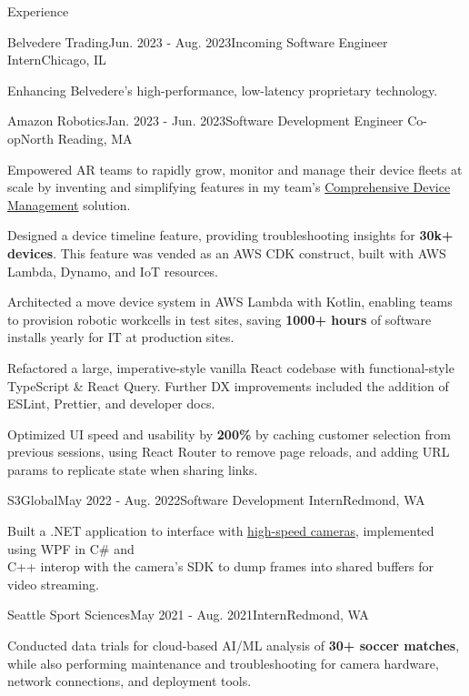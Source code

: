\documentclass{resume}
\begin{document}
  \begin{rSection}{Experience}
    \begin{rSubsection}{Belvedere Trading}{Jun. 2023 - Aug. 2023}{Incoming Software Engineer Intern}{Chicago, IL}
        \item Enhancing Belvedere’s high-performance, low-latency proprietary technology.
    \end{rSubsection}
    \begin{rSubsection}{Amazon Robotics}{Jan. 2023 - Jun. 2023}{Software Development Engineer Co-op}{North Reading, MA}
        \item Empowered AR teams to rapidly grow, monitor and manage their device fleets at scale by inventing and simplifying features in my team's \href{https://www.allthingsdistributed.com/2021/07/amazon-robotics-on-aws.html}{Comprehensive Device Management} solution. 
        \item Designed a device timeline feature, providing troubleshooting insights for \textbf{30k+ devices}. This feature was vended as an AWS CDK construct, built with AWS Lambda, Dynamo, and IoT resources. 
    \item Architected a move device system in AWS Lambda with Kotlin, enabling teams to
        provision robotic workcells in test sites, saving \textbf{1000+ hours} of software installs yearly for IT at production sites.
        \item Refactored a large, imperative-style vanilla React codebase with functional-style TypeScript \& React Query. Further DX improvements included the addition of ESLint, Prettier, and developer docs. 
        \item Optimized UI speed and usability by \textbf{200\%} by caching customer selection from previous sessions, using React Router to remove page reloads, and adding URL params to replicate state when sharing links.
    \end{rSubsection}
    \begin{rSubsection}{S3Global}{May 2022 - Aug. 2022}{Software Development Intern}{Redmond, WA}
        \item Built a .NET application to interface with \href{https://emergentvisiontec.com/}{high-speed cameras}, implemented using WPF in C\# and \\ C++ interop with the camera's SDK to dump frames into shared buffers for video streaming.
    \end{rSubsection}
    \begin{rSubsection}{Seattle Sport Sciences}{May 2021 - Aug. 2021}{Intern}{Redmond, WA}
        \item Conducted data trials for cloud-based AI/ML analysis of \textbf{30+ soccer matches}, while also performing maintenance and troubleshooting for camera hardware, network connections, and deployment tools.
    \end{rSubsection}
  \end{rSection}
  
\end{document}
